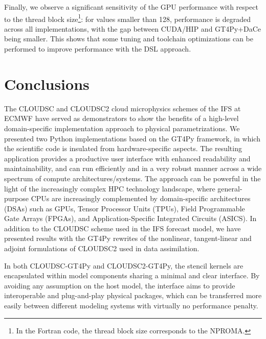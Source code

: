\documentclass[gmd,manuscript,online]{copernicus}
\theoremstyle{theorem}
\theoremstyle{definition}
\theoremstyle{remark}
\theoremstyle{proposition}
\begin{document}
	Finally, we observe a significant sensitivity of the GPU performance with respect to the thread block size\footnote{In the Fortran code, the thread block size corresponds to the NPROMA.}: for values smaller than 128, performance is degraded across all implementations, with the gap between CUDA/HIP and GT4Py+DaCe being smaller. This shows that some tuning and toolchain optimizations can be performed to improve performance with the DSL approach.

	\section{Conclusions}
	\label{section:conclusions}

	The CLOUDSC and CLOUDSC2 cloud microphysics schemes of the IFS at ECMWF have served as demonstrators to show the benefits of a high-level domain-specific implementation approach to physical parametrizations. We presented two Python implementations based on the GT4Py framework, in which the scientific code is insulated from hardware-specific aspects. The resulting application provides a productive user interface with enhanced readability and maintainability, and can run efficiently and in a very robust manner across a wide spectrum of compute architectures/systems. The approach can be powerful in the light of the increasingly complex HPC technology landscape, where general-purpose CPUs are increasingly complemented by domain-specific architectures (DSAs) such as GPUs, Tensor Processor Units (TPUs), Field Programmable Gate Arrays (FPGAs), and Application-Specific Integrated Circuits (ASICS). In addition to the CLOUDSC scheme used in the IFS forecast model, we have presented results with the GT4Py rewrites of the nonlinear, tangent-linear and adjoint formulations of CLOUDSC2 used in data assimilation.

	In both CLOUDSC-GT4Py and CLOUDSC2-GT4Py, the stencil kernels are encapsulated within model components sharing a minimal and clear interface. By avoiding any assumption on the host model, the interface aims to provide interoperable and plug-and-play physical packages, which can be transferred more easily between different modeling systems with virtually no performance penalty.
\end{document}
